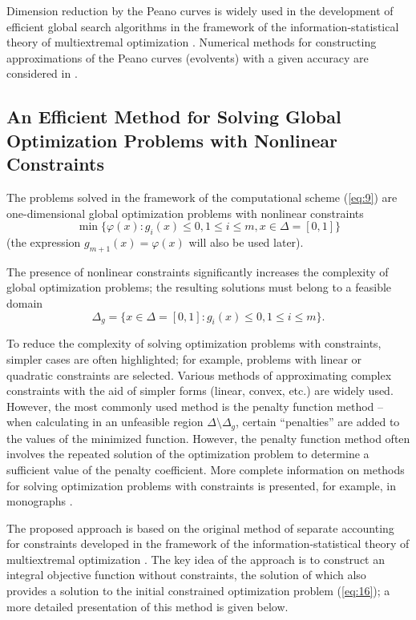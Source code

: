 \documentclass[smallextended]{svjour3}       %
\begin{document}
Dimension reduction by the Peano curves is widely used in the development of efficient global search algorithms in the framework of the information-statistical theory of multiextremal optimization \cite{c17,c18,c23,c26,c27}. Numerical methods for constructing approximations of the Peano curves (evolvents) with a given accuracy are considered in \cite{c17,c18}.

\subsection{An Efficient Method for Solving Global Optimization Problems with Nonlinear Constraints}

The problems solved in the framework of the computational scheme (\ref{eq:9}) are one-dimensional global optimization problems with nonlinear constraints
\begin{equation}\label{eq:16}
\min{\{\varphi(x):g_i(x)\leq 0, 1 \leq i \leq m, x\in \Delta=[0,1]\}}
\end{equation}
(the expression $g_{m+1}(x) = \varphi(x)$ will also be used later).

The presence of nonlinear constraints significantly increases the complexity of global optimization problems; the resulting solutions must belong to a feasible domain
\begin{equation}\label{eq:17}
\Delta_g  = \{ x\in \Delta=[0,1]:g_i(x)\leq 0, 1 \leq i \leq m \}.
\end{equation}

To reduce the complexity of solving optimization problems with constraints, simpler cases are often highlighted; for example, problems with linear or quadratic constraints are selected. Various methods of approximating complex constraints with the aid of simpler forms (linear, convex, etc.) are widely used. However, the most commonly used method is the penalty function method -- when calculating in an unfeasible region $\Delta \setminus \Delta_g$, certain ``penalties'' are added to the values of the minimized function. However, the penalty function method often involves the repeated solution of the optimization problem to determine a sufficient value of the penalty coefficient. More complete information on methods for solving optimization problems with constraints is presented, for example, in monographs \cite{c28,c29}.

The proposed approach is based on the original method of separate accounting for constraints developed in the framework of the information-statistical theory of multiextremal optimization \cite{c18}. The key idea of the approach is to construct an integral objective function without constraints, the solution of which also provides a solution to the initial constrained optimization problem (\ref{eq:16}); a more detailed presentation of this method is given below.
\end{document}
